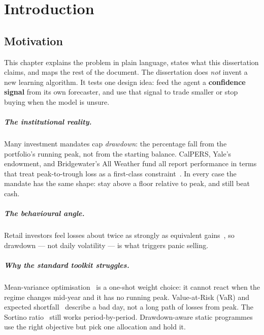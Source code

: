 \chapter{Introduction}
\label{ch:introduction}



\section{Motivation}
\label{sec:motivation}

This chapter explains the problem in plain language, states what this dissertation claims, and maps the rest of the document. The dissertation does \emph{not} invent a new learning algorithm. It tests one design idea: feed the agent a \textbf{confidence signal} from its own forecaster, and use that signal to trade smaller or stop buying when the model is unsure.

\paragraph{The institutional reality.} Many investment mandates cap \emph{drawdown}: the percentage fall from the portfolio's running peak, not from the starting balance. CalPERS, Yale's endowment, and Bridgewater's All Weather fund all report performance in terms that treat peak-to-trough loss as a first-class constraint~\parencite{calpers2022policy,yale2023endowment,dalio2017principles}. In every case the mandate has the same shape: stay above a floor relative to peak, and still beat cash.

\paragraph{The behavioural angle.} Retail investors feel losses about twice as strongly as equivalent gains~\parencite{tversky1992cumulative}, so drawdown --- not daily volatility --- is what triggers panic selling.

\paragraph{Why the standard toolkit struggles.} Mean-variance optimisation~\parencite{markowitz1952portfolio} is a one-shot weight choice: it cannot react when the regime changes mid-year and it has no running peak. Value-at-Risk (VaR) and expected shortfall~\parencite{rockafellar2000optimization} describe a bad day, not a long path of losses from peak. The Sortino ratio~\parencite{sortino1994downside} still works period-by-period. Drawdown-aware static programmes~\parencite{magdon2004sample,chekhlov2005drawdown} use the right objective but pick one allocation and hold it.

